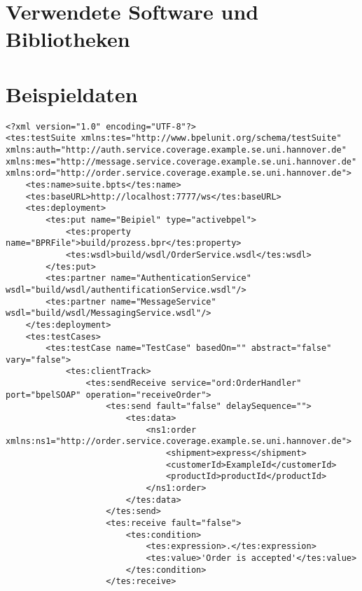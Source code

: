 \begin{appendix}
\chapter{Verwendete Software und Bibliotheken}
\chapter{}
  \chapter{Beispieldaten}
\begin{tiny}
  \begin{verbatim}
<?xml version="1.0" encoding="UTF-8"?>
<tes:testSuite xmlns:tes="http://www.bpelunit.org/schema/testSuite" 
xmlns:auth="http://auth.service.coverage.example.se.uni.hannover.de" 
xmlns:mes="http://message.service.coverage.example.se.uni.hannover.de" 
xmlns:ord="http://order.service.coverage.example.se.uni.hannover.de">
    <tes:name>suite.bpts</tes:name>
    <tes:baseURL>http://localhost:7777/ws</tes:baseURL>
    <tes:deployment>
        <tes:put name="Beipiel" type="activebpel">
            <tes:property name="BPRFile">build/prozess.bpr</tes:property>
            <tes:wsdl>build/wsdl/OrderService.wsdl</tes:wsdl>
        </tes:put>
        <tes:partner name="AuthenticationService" wsdl="build/wsdl/authentificationService.wsdl"/>
        <tes:partner name="MessageService" wsdl="build/wsdl/MessagingService.wsdl"/>
    </tes:deployment>
    <tes:testCases>
        <tes:testCase name="TestCase" basedOn="" abstract="false" vary="false">
            <tes:clientTrack>
                <tes:sendReceive service="ord:OrderHandler" port="bpelSOAP" operation="receiveOrder">
                    <tes:send fault="false" delaySequence="">
                        <tes:data>
                            <ns1:order xmlns:ns1="http://order.service.coverage.example.se.uni.hannover.de">
                                <shipment>express</shipment>
                                <customerId>ExampleId</customerId>
                                <productId>productId</productId>
                            </ns1:order>
                        </tes:data>
                    </tes:send>
                    <tes:receive fault="false">
                        <tes:condition>
                            <tes:expression>.</tes:expression>
                            <tes:value>'Order is accepted'</tes:value>
                        </tes:condition>
                    </tes:receive>

\end{verbatim}
\end{tiny}
\end{appendix}
